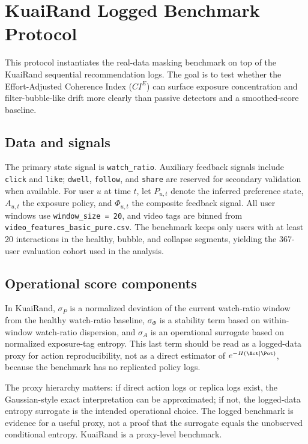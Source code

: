 \section{KuaiRand Logged Benchmark Protocol}\label{app:kuairand}

This protocol instantiates the real-data masking benchmark on top of the
KuaiRand sequential recommendation logs. The goal is to test whether the
Effort-Adjusted Coherence Index ($CI^E$) can surface exposure concentration
and filter-bubble-like drift more clearly than passive detectors and a
smoothed-score baseline.

\subsection*{Data and signals}
The primary state signal is \texttt{watch\_ratio}. Auxiliary feedback signals
include \texttt{click} and \texttt{like}; \texttt{dwell}, \texttt{follow},
and \texttt{share} are reserved for secondary validation when available.
For user $u$ at time $t$, let $P_{u,t}$ denote the inferred preference state,
$A_{u,t}$ the exposure policy, and $\Phi_{u,t}$ the composite feedback signal.
All user windows use \texttt{window\_size = 20}, and video tags are binned from
\texttt{video\_features\_basic\_pure.csv}.
The benchmark keeps only users with at least 20 interactions in the healthy,
bubble, and collapse segments, yielding the 367-user evaluation cohort used in
the analysis.

\subsection*{Operational score components}
In KuaiRand, $\sigma_P$ is a normalized deviation of the current watch-ratio
window from the healthy watch-ratio baseline, $\sigma_\Phi$ is a stability term
based on within-window watch-ratio dispersion, and $\sigma_A$ is an operational
surrogate based on normalized exposure-tag entropy. This last term should be
read as a logged-data proxy for action reproducibility, not as a direct
estimator of $e^{-H(\Act\mid\Pot)}$, because the benchmark has no replicated
policy logs.

The proxy hierarchy matters: if direct action logs or replica logs exist, the
Gaussian-style exact interpretation can be approximated; if not, the logged-data
entropy surrogate is the intended operational choice. The logged benchmark is
evidence for a useful proxy, not a proof that the surrogate equals the
unobserved conditional entropy. KuaiRand is a proxy-level benchmark.

